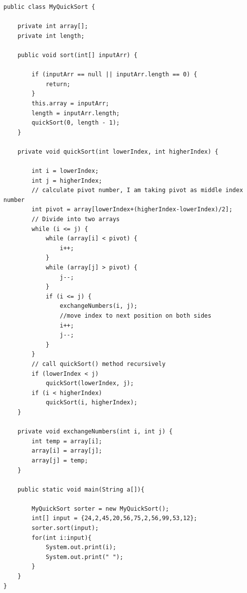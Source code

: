 \newpage

\begin{lstlisting}[caption=Quick Sort ohne Comparator]
public class MyQuickSort {
     
    private int array[];
    private int length;
 
    public void sort(int[] inputArr) {
         
        if (inputArr == null || inputArr.length == 0) {
            return;
        }
        this.array = inputArr;
        length = inputArr.length;
        quickSort(0, length - 1);
    }
 
    private void quickSort(int lowerIndex, int higherIndex) {
         
        int i = lowerIndex;
        int j = higherIndex;
        // calculate pivot number, I am taking pivot as middle index number
        int pivot = array[lowerIndex+(higherIndex-lowerIndex)/2];
        // Divide into two arrays
        while (i <= j) {
            while (array[i] < pivot) {
                i++;
            }
            while (array[j] > pivot) {
                j--;
            }
            if (i <= j) {
                exchangeNumbers(i, j);
                //move index to next position on both sides
                i++;
                j--;
            }
        }
        // call quickSort() method recursively
        if (lowerIndex < j)
            quickSort(lowerIndex, j);
        if (i < higherIndex)
            quickSort(i, higherIndex);
    }
 
    private void exchangeNumbers(int i, int j) {
        int temp = array[i];
        array[i] = array[j];
        array[j] = temp;
    }
     
    public static void main(String a[]){
         
        MyQuickSort sorter = new MyQuickSort();
        int[] input = {24,2,45,20,56,75,2,56,99,53,12};
        sorter.sort(input);
        for(int i:input){
            System.out.print(i);
            System.out.print(" ");
        }
    }
}
\end{lstlisting}
\clearpage

